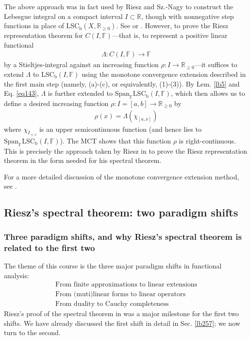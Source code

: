 \documentclass[12pt,b5paper,notitlepage]{article}
\theoremstyle{definition}
\theoremstyle{plain}
\newcommand{\Span}{\mathrm{Span}}
\newcommand{\Rbb}{\mathbb R}
\newcommand{\Fbb}{\mathbb F}
\newcommand{\LSCb}{\mathrm{LSC}_{\mathrm b}}
\numberwithin{equation}{section}
\begin{document}
The above approach was in fact used by Riesz and Sz.-Nagy to construct the Lebesgue integral on a compact interval $I\subset\Rbb$, though with nonnegative step functions in place of $\LSCb(X,\Rbb_{\geq0})$. See \cite[Sec. 16-22]{RN} or \cite[Ch. 10]{Apo}. However, to prove the Riesz representation theorem for $C(I,\Fbb)$---that is, to represent a positive linear functional
\begin{align*}
\Lambda:C(I,\Fbb)\rightarrow\Fbb
\end{align*}
by a Stieltjes-integral against an increasing function $\rho:I\rightarrow\Rbb_{\geq0}$---it suffices to extend $\Lambda$ to $\LSCb(I,\Fbb)$ using the monotone convergence extension described in the first main step (namely, (a)-(c), or equivalently, (1)-(3)). By Lem. \ref{lb5} and Eq. \eqref{eq143}, $\Lambda$ is further extended to $\Span_\Fbb\LSCb(I,\Fbb)$, which then allows us to define a desired increasing function $\rho:I=[a,b]\rightarrow\Rbb_{\geq0}$ by
\begin{align*}
\rho(x)=\Lambda(\chi_{[a,x]})
\end{align*}
where $\chi_{I_{\leq x}}$ is an upper semicontinuous function (and hence lies to $\Span_\Fbb\LSCb(I,\Fbb)$). The MCT shows that this function $\rho$ is right-continuous. This is precisely the approach taken by Riesz in \cite{Rie13} to prove the Riesz representation theorem in the form needed for his spectral theorem.


For a more detailed discussion of the monotone convergence extension method, see \cite[Ch. 25]{Gui-A}.






\subsection{Riesz's spectral theorem: two paradigm shifts}\label{lb245}

\subsubsection{Three paradigm shifts, and why Riesz's spectral theorem is related to the first two}


The theme of this course is the three major paradigm shifts in functional analysis:
\begin{subequations}\label{eq147}
\begin{gather}
\text{From finite approximations to linear extensions}\label{eq147a}\\
\text{From (muti)linear forms to linear operators}\label{eq147b}\\
\text{From duality to Cauchy completeness}\label{eq147c}
\end{gather}
\end{subequations}
Riesz's proof of the spectral theorem in \cite{Rie13} was a major milestone for the first two shifts. We have already discussed the first shift in detail in Sec. \ref{lb257}; we now turn to the second.
\end{document}
